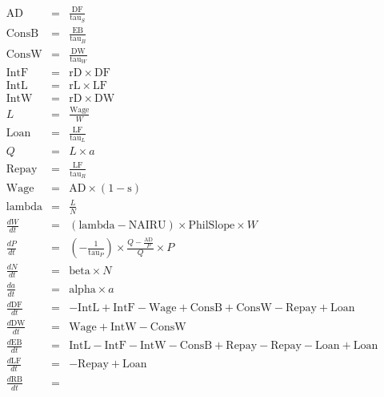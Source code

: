 \documentclass{article}
\begin{document}
\begin{eqnarray*}
\mathrm{AD}&=&\frac{\mathrm{DF}}{\mathrm{tau}_S}\\
\mathrm{ConsB}&=&\frac{\mathrm{EB}}{\mathrm{tau}_B}\\
\mathrm{ConsW}&=&\frac{\mathrm{DW}}{\mathrm{tau}_W}\\
\mathrm{IntF}&=&\mathrm{rD}\times \mathrm{DF}\\
\mathrm{IntL}&=&\mathrm{rL}\times \mathrm{LF}\\
\mathrm{IntW}&=&\mathrm{rD}\times \mathrm{DW}\\
L&=&\frac{\mathrm{Wage}}{W}\\
\mathrm{Loan}&=&\frac{\mathrm{LF}}{\mathrm{tau}_L}\\
Q&=&L\times a\\
\mathrm{Repay}&=&\frac{\mathrm{LF}}{\mathrm{tau}_R}\\
\mathrm{Wage}&=&\mathrm{AD}\times \left(\mathrm{1-s}\right)\\
\mathrm{lambda}&=&\frac{L}{N}\\
\frac{ d W}{dt} &=&\left(\mathrm{lambda}-\mathrm{NAIRU}\right)\times \mathrm{PhilSlope}\times W\\
\frac{ d P}{dt} &=&\left(-\frac{1}{\mathrm{tau}_P}\right)\times \frac{Q-\frac{\mathrm{AD}}{P}}{Q}\times P\\
\frac{ d N}{dt} &=&\mathrm{beta}\times N\\
\frac{ d a}{dt} &=&\mathrm{alpha}\times a\\
\frac{ d \mathrm{DF}}{dt} &=&-\mathrm{IntL}+\mathrm{IntF}-\mathrm{Wage}+\mathrm{ConsB}+\mathrm{ConsW}-\mathrm{Repay}+\mathrm{Loan}\\
\frac{ d \mathrm{DW}}{dt} &=&\mathrm{Wage}+\mathrm{IntW}-\mathrm{ConsW}\\
\frac{ d \mathrm{EB}}{dt} &=&\mathrm{IntL}-\mathrm{IntF}-\mathrm{IntW}-\mathrm{ConsB}+\mathrm{Repay}-\mathrm{Repay}-\mathrm{Loan}+\mathrm{Loan}\\
\frac{ d \mathrm{LF}}{dt} &=&-\mathrm{Repay}+\mathrm{Loan}\\
\frac{ d \mathrm{RB}}{dt} &=&\\
\end{eqnarray*}
\end{document}
